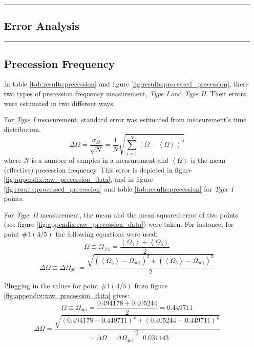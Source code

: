 {\color{gray}\hrule}
\begin{center}
\section{Error Analysis} \label{appendix:errors}
\bigskip
\end{center}
{\color{gray}\hrule}

\begin{multicols}{2}
\subsection{Precession Frequency}
\label{appendix:errors:precession_frequency}

In table \ref{tab:results:precession} and figure \ref{fig:results:processed_precession}, there two types of precession frequency measurement, \emph{Type I} and \emph{Type II}. Their errors were estimated in two different ways.

For \emph{Type I} measurement, standard error was estimated from measurement's time distribution.
\begin{equation*}
  \Delta\Omega = \frac{\sigma_{\Omega}}{\sqrt{N}} = \frac{1}{N}\sqrt{\sum\limits_{i=1}^N(\Omega - \left<\Omega\right>)^2}
\end{equation*}
where $N$ is a number of samples in a measurement and $\left< \Omega \right>$ is the mean (effective) precession frequency. This error is depicted in figure \ref{fig:appendix:raw_precession_data}, and in figure \ref{fig:results:processed_precession} and table \ref{tab:results:precession} for \emph{Type I} points.

For \emph{Type II} measurement, the mean and the mean squared error of two points (see figure \ref{fig:appendix:raw_precession_data}) were taken. For instance, for point $\#1 (4/5)$ the following equations were used:
\begin{equation*}
  \Omega \equiv \Omega_{\#1} = \frac{\left< \Omega_{4} \right> + \left< \Omega_{5} \right>}{2}
\end{equation*}
\begin{equation*}
  \Delta\Omega \equiv \Delta\Omega_{\#1} = \frac{\sqrt{(\left< \Omega_{4} \right> - \Omega_{\#1})^{2} + (\left< \Omega_{5} \right> - \Omega_{\#1})^{2}}}{2}
\end{equation*}

Plugging in the values for point $\#1 (4/5)$ from figure \ref{fig:appendix:raw_precession_data} gives:
\begin{equation*}
  \Omega \equiv \Omega_{\#1} = \frac{0.494178 + 0.405244}{2} = 0.449711
\end{equation*}
\begin{equation*}
  \Delta\Omega = \frac{\sqrt{(0.494178 - 0.449711)^{2} + (0.405244 - 0.449711)^{2}}}{2}
\end{equation*}
\begin{equation*}
  \Rightarrow \Delta \Omega = \Delta \Omega_{\#1} = 0.031443
\end{equation*}


\end{multicols}
